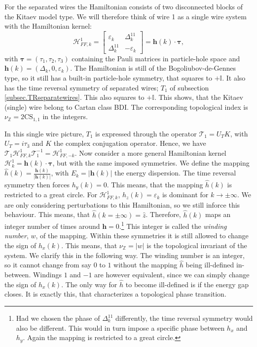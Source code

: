 For the separated wires the Hamiltonian consists of two disconnected blocks of the Kitaev model type. We will therefore think of wire 1 as a single wire system with the Hamiltonian kernel:
\begin{equation}
\mathcal{H}^{1}_{FF,k} = \begin{bmatrix} \varepsilon_k & \Delta^{11}_k \\ \Delta^{11}_k & -\varepsilon_k \end{bmatrix} = \mathbf{h}(k)\cdot\boldsymbol\tau,
\label{eq.singlewire.Hamiltoniankernel}
\end{equation}
with $\boldsymbol\tau = (\tau_1, \tau_2, \tau_3)$ containing the Pauli matrices in particle-hole space and $\mathbf{h}(k) = (\Delta_k, 0, \varepsilon_k)$. The Hamiltonian is still of the Bogoliubov-de-Gennes type, so it still has a built-in particle-hole symmetry, that squares to $+\mathbb{I}$. It also has the time reversal symmetry of separated wires; $T_1$ of subsection \ref{subsec.TRseparatewires}. This also squares to $+\mathbb{I}$.  This shows, that the Kitaev (single) wire belong to Cartan class BDI. The corresponding topological index is $\nu_{\mathbb{Z}} = 2\text{CS}_{1,1}$ in the integers. 

In this single wire picture, $T_1$ is expressed through the operator $\mathcal{T}_1 = U_TK$, with $U_T = i\tau_3$ and $K$ the complex conjugation operator. Hence, we have $\mathcal{T}_1\mathcal{H}^{1}_{FF,k}\mathcal{T}^{-1}_1 = \mathcal{H}^{1}_{FF,-k}$. Now consider a more general Hamiltonian kernel $\mathcal{H}^{1}_k = \mathbf{h}(k)\cdot\boldsymbol\tau$, but with the same imposed symmetries. We define the mapping $\hat{h}(k) = \frac{\mathbf{h}(k)}{|\mathbf{h}(k)|}$, with $E_k = |\mathbf{h}(k)|$ the energy dispersion. The time reversal symmetry then forces $h_y(k) = 0$. This means, that the mapping $\hat{h}(k)$ is restricted to a great circle. For $\mathcal{H}^{1}_{FF,k}$, $h_z(k) = \varepsilon_k$ is dominant for $k\to \pm \infty$. We are only considering perturbations to this Hamiltonian, so we still inforce this behaviour. This means, that $\hat{h}(k = \pm \infty) = \hat{z}$. Therefore, $\hat{h}(k)$ maps an integer number of times around $\mathbf{h} = 0$.\footnote{Had we chosen the phase of $\Delta^{11}_k$ differently, the time reversal symmetry would also be different. This would in turn impose a specific phase between $h_x$ and $h_y$. Again the mapping is restricted to a great circle.} This integer is called the \textit{winding number}, $w$, of the mapping. Within these symmetries it is still allowed to change the sign of $h_x(k)$. This means, that $\nu_{\mathbb{Z}} = |w|$ is the topological invariant of the system. We clarify this in the following way. The winding number is an integer, so it cannot change from say $0$ to $1$ without the mapping $\hat{h}$ being ill-defined in-between. Windings $1$ and $-1$ are however equivalent, since we can simply change the sign of $h_x(k)$. The only way for $\hat{h}$ to become ill-defined is if the energy gap closes. It is exactly this, that characterizes a topological phase transition. 


